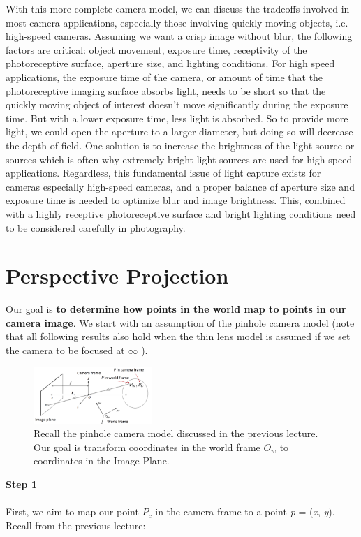 \documentclass[]{article}
\begin{document}
With this more complete camera model, we can discuss the tradeoffs involved in most camera applications, especially those involving quickly moving objects, i.e. high-speed cameras. Assuming we want a crisp image without blur, the following factors are critical: object movement, exposure time, receptivity of the photoreceptive surface, aperture size, and lighting conditions. For high speed applications, the exposure time of the camera, or amount of time that the photoreceptive imaging surface absorbs light, needs to be short so that the quickly moving object of interest doesn't move significantly during the exposure time. But with a lower exposure time, less light is absorbed. So to provide more light, we could open the aperture to a larger diameter, but doing so will decrease the depth of field. One solution is to increase the brightness of the light source or sources which is often why extremely bright light sources are used for high speed applications. Regardless, this fundamental issue of light capture exists for cameras especially high-speed cameras, and a proper balance of aperture size and exposure time is needed to optimize blur and image brightness. This, combined with a highly receptive photoreceptive surface and bright lighting conditions need to be considered carefully in photography.


\section{Perspective Projection}
Our goal is \textbf{to determine how points in the world map to points in our camera image}. We start with an assumption of the pinhole camera model (note that all following results also hold when the thin lens model is assumed if we set the camera to be focused at $\infty$ ).

\begin{figure}[H]
\includegraphics[width=0.4\textwidth]{diagram_1_vik.png}
\centering
\caption{Recall the pinhole camera model discussed in the previous lecture. Our goal is transform coordinates in the world frame $O_w$ to coordinates in the Image Plane. }
\label{fig:pinhole_cam}
\end{figure}

\textbf{Step 1}\\\\
First, we aim to map our point $P_c$ in the camera frame to a point \textit{p} = (\textit{x}, \textit{y}). Recall from the previous lecture:
\end{document}
